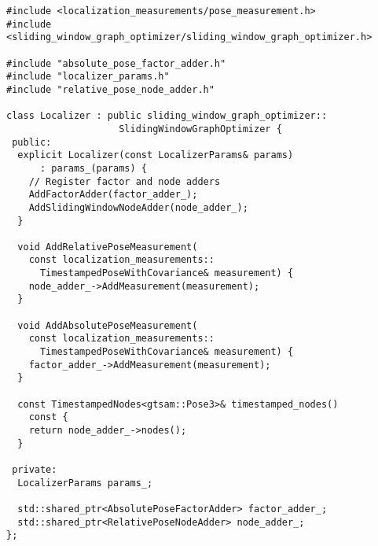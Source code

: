\begin{verbatim}
#include <localization_measurements/pose_measurement.h>
#include <sliding_window_graph_optimizer/sliding_window_graph_optimizer.h>

#include "absolute_pose_factor_adder.h"
#include "localizer_params.h"
#include "relative_pose_node_adder.h"

class Localizer : public sliding_window_graph_optimizer::
                    SlidingWindowGraphOptimizer {
 public:
  explicit Localizer(const LocalizerParams& params)
      : params_(params) {
    // Register factor and node adders
    AddFactorAdder(factor_adder_);
    AddSlidingWindowNodeAdder(node_adder_);
  }

  void AddRelativePoseMeasurement(
    const localization_measurements::
      TimestampedPoseWithCovariance& measurement) {
    node_adder_->AddMeasurement(measurement);
  }

  void AddAbsolutePoseMeasurement(
    const localization_measurements::
      TimestampedPoseWithCovariance& measurement) {
    factor_adder_->AddMeasurement(measurement);
  }

  const TimestampedNodes<gtsam::Pose3>& timestamped_nodes()
    const {
    return node_adder_->nodes();
  }

 private:
  LocalizerParams params_;

  std::shared_ptr<AbsolutePoseFactorAdder> factor_adder_;
  std::shared_ptr<RelativePoseNodeAdder> node_adder_;
};
\end{verbatim}
